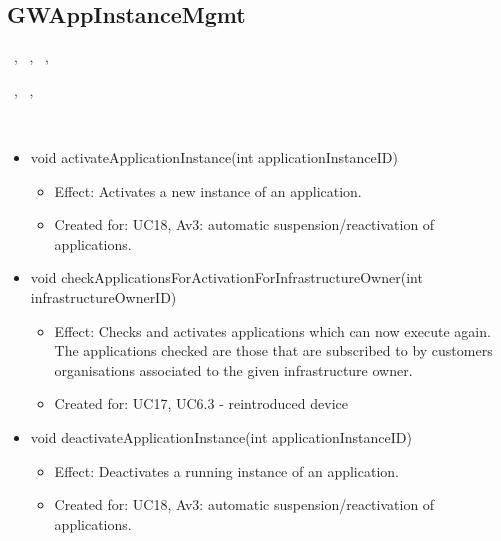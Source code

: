   \subsection{GWAppInstanceMgmt}\label{int:OnlineServiceOnlineServiceApplicationManagerApplicationManagementLogicGWAppInstanceMgmt}
    \begin{description}
      \item[Provided by:] \iconcomponent{}~, \iconcomponent{}~, \iconcomponent{}~, \iconcomponent{}~
      \item[Required by:] \iconcomponent{}~, \iconcomponent{}~, \iconcomponent{}~
      \item[Operations:] ~
    \begin{itemize}[noitemsep,nolistsep,leftmargin=-.25cm]
      \item \textsf{void activateApplicationInstance(int applicationInstanceID)}
        \begin{itemize}[noitemsep,nolistsep]
           \item Effect: Activates a new instance of an application.
\item Created for: UC18, Av3: automatic suspension/reactivation of applications.
        \end{itemize}
      \item \textsf{void checkApplicationsForActivationForInfrastructureOwner(int infrastructureOwnerID)}
        \begin{itemize}[noitemsep,nolistsep]
           \item Effect: Checks and activates applications which can now execute again. The applications checked are those that are subscribed to by customers organisations associated to the given infrastructure owner.
\item Created for: UC17, UC6.3 - reintroduced device
        \end{itemize}
      \item \textsf{void deactivateApplicationInstance(int applicationInstanceID)}
        \begin{itemize}[noitemsep,nolistsep]
           \item Effect: Deactivates a running instance of an application.
\item Created for: UC18, Av3: automatic suspension/reactivation of applications.
        \end{itemize}
    \end{itemize}
    \end{description}

